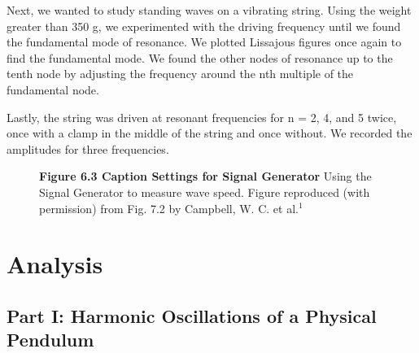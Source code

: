 \documentclass[11pt]{report}
\begin{document}
Next, we wanted to study standing waves on a vibrating string. Using the weight
greater than 350 g, we experimented with the driving frequency until we found the
fundamental mode of resonance.  We plotted Lissajous figures once again to
find the fundamental mode.  We found the other nodes of resonance up to the tenth
node by adjusting the frequency around the nth multiple of the fundamental node.

Lastly, the string was driven at resonant frequencies for n = 2, 4, and 5 twice,
once with a clamp in the middle of the string and once without.  We recorded the
amplitudes for three frequencies.

\begin{figure}[h!]
    \captionsetup{labelformat=empty}
    \caption{\textbf{Figure 6.3 Caption Settings for Signal Generator}  Using
    the Signal Generator to measure wave speed.  Figure reproduced (with
permission) from Fig. 7.2 by Campbell, W. C. et al.$^1$}
\end{figure}

\section*{Analysis}

\subsection*{Part I: Harmonic Oscillations of a Physical Pendulum}

\end{document}
